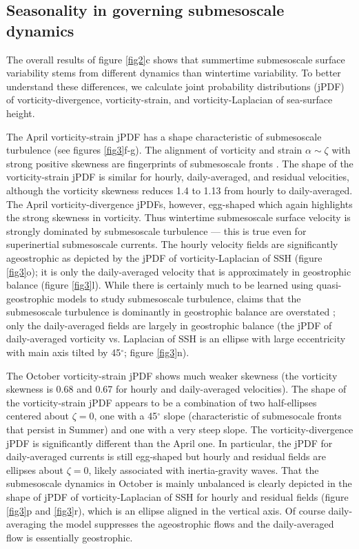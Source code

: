 \documentclass[grl]{agutex2015}
\begin{document}
\begin{article}
\section{Seasonality in governing submesoscale dynamics}
The overall results of figure \ref{fig2}c shows that summertime submesoscale surface
 variability stems from different dynamics than wintertime variability.
 To better understand these differences, we calculate
joint probability distributions (jPDF) of
vorticity-divergence, vorticity-strain, and vorticity-Laplacian of sea-surface height.

The April vorticity-strain jPDF has a shape characteristic of submesoscale turbulence
 (see figures \ref{fig3}f-g). The alignment of vorticity and strain $\alpha \sim \zeta$
 with strong positive skewness are fingerprints of submesoscale fronts
 \citep{shcherbina_etal2013,mcwilliams2016}. The shape of the vorticity-strain
 jPDF is similar for hourly, daily-averaged, and residual velocities, although
 the vorticity skewness reduces 1.4 to 1.13 from hourly to daily-averaged.
 The April vorticity-divergence jPDFs, however, egg-shaped which again highlights
 the strong skewness in vorticity. Thus wintertime submesoscale surface velocity
 is strongly dominated by submesoscale turbulence --- this is true even for
 superinertial submesoscale currents. The hourly velocity fields are significantly
ageostrophic as depicted by the jPDF of vorticity-Laplacian of SSH
(figure \ref{fig3}o); it is only the daily-averaged velocity that is approximately
in geostrophic balance (figure \ref{fig3}l). While there is certainly much to be
learned using quasi-geostrophic models to study submesoscale turbulence, claims that
the submesoscale turbulence is dominantly in geostrophic balance
are overstated \citep{sasaki_etal2014,callies_etal2016}; only the daily-averaged fields
are largely
in  geostrophic balance (the jPDF of daily-averaged vorticity vs. Laplacian of SSH
is an ellipse with large eccentricity with main axis tilted by 45$^\circ$; figure \ref{fig3}n).

The October vorticity-strain jPDF shows much weaker skewness (the vorticity skewness
is 0.68 and 0.67 for hourly and daily-averaged velocities). The shape of the
vorticity-strain jPDF  appears to be a combination of two half-ellipses centered
about $\zeta=0$, one with a 45$^\circ$ slope (characteristic of submesocale fronts
that persist in Summer) and one with a very steep slope. The vorticity-divergence
jPDF is significantly different than the April one. In particular, the jPDF
for daily-averaged currents is still egg-shaped but hourly and residual fields are
ellipses about $\zeta=0$, likely associated with inertia-gravity waves.
That the submesoscale dynamics in October is mainly unbalanced is clearly depicted
in the shape of jPDF of vorticity-Laplacian of SSH for hourly and
residual fields
(figure \ref{fig3}p and \ref{fig3}r), which is an ellipse aligned in the vertical axis.
Of course daily-averaging the model suppresses the ageostrophic flows and
the daily-averaged flow is essentially geostrophic.


\end{article}
\end{document}

